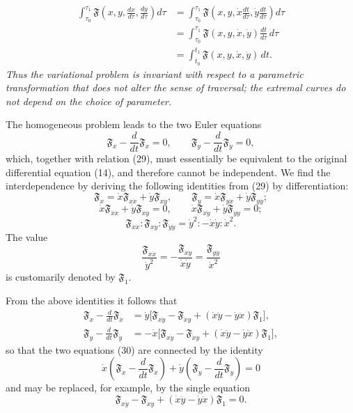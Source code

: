 \begin{align*}
\int_{\tau_0}^{\tau_1}\mathfrak F\left(x,y,\frac{dx}{d\tau},\frac{dy}{d\tau}\right)d\tau
&=\int_{\tau_0}^{\tau_1}\mathfrak F\left(x,y,\dot x\frac{dt}{d\tau},\dot y\frac{dt}{d\tau}\right)d\tau\\
&=\int_{\tau_0}^{\tau_1}\mathfrak F(x,y,\dot x,\dot y)\frac{dt}{d\tau}\,d\tau\\
&=\int_{t_0}^{t_1}\mathfrak F(x,y,\dot x,\dot y)\,dt.
\end{align*}
\emph{Thus the variational problem is invariant with respect to a parametric transformation that does not alter the sense of traversal; the extremal curves do not depend on the choice of parameter.}

The homogeneous problem leads to the two Euler equations
\begin{equation}\tag{30}
\mathfrak F_x-\frac{d}{dt}\mathfrak F_{\dot x}=0,
\qquad
\mathfrak F_y-\frac{d}{dt}\mathfrak F_{\dot y}=0,
\end{equation}
which, together with relation (29), must essentially be equivalent to the original differential equation (14), and therefore cannot be independent. We find the interdependence by deriving the following identities from (29) by differentiation:
\[
\mathfrak F_x=\dot x\mathfrak F_{x\dot x}+\dot y\mathfrak F_{x\dot y},
\qquad
\mathfrak F_y=\dot x\mathfrak F_{y\dot x}+\dot y\mathfrak F_{y\dot y};
\]
\[
\dot x\mathfrak F_{\dot x\dot x}+\dot y\mathfrak F_{\dot x\dot y}=0,
\qquad
\dot x\mathfrak F_{\dot x\dot y}+\dot y\mathfrak F_{\dot y\dot y}=0;
\]
\[
\mathfrak F_{\dot x\dot x}:\mathfrak F_{\dot x\dot y}:\mathfrak F_{\dot y\dot y}
=\dot y^2:-\dot x\dot y:\dot x^2.
\]
The value
\[
\frac{\mathfrak F_{\dot x\dot x}}{\dot y^2}
=-\frac{\mathfrak F_{\dot x\dot y}}{\dot x\dot y}
=\frac{\mathfrak F_{\dot y\dot y}}{\dot x^2}
\]
is customarily denoted by $\mathfrak F_1$.

From the above identities it follows that
\begin{align*}
\mathfrak F_x-\frac{d}{dt}\mathfrak F_{\dot x}
&=\dot y\bigl[\mathfrak F_{x\dot y}-\mathfrak F_{\dot x y}
 +(\dot x\ddot y-\dot y\ddot x)\mathfrak F_1\bigr],\\
\mathfrak F_y-\frac{d}{dt}\mathfrak F_{\dot y}
&=-\dot x\bigl[\mathfrak F_{x\dot y}-\mathfrak F_{\dot x y}
 +(\dot x\ddot y-\dot y\ddot x)\mathfrak F_1\bigr],
\end{align*}
so that the two equations (30) are connected by the identity
\begin{equation}\tag{31}
\dot x\left(\mathfrak F_x-\frac{d}{dt}\mathfrak F_{\dot x}\right)
+\dot y\left(\mathfrak F_y-\frac{d}{dt}\mathfrak F_{\dot y}\right)=0
\end{equation}
and may be replaced, for example, by the single equation
\begin{equation}\tag{32}
\mathfrak F_{x\dot y}-\mathfrak F_{\dot x y}
 +(\dot x\ddot y-\dot y\ddot x)\mathfrak F_1=0.
\end{equation}

